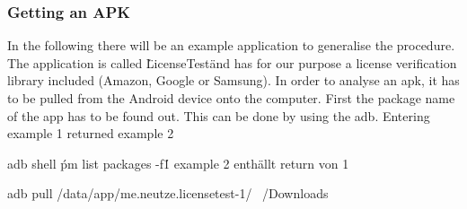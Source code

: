 \subsubsection{Getting an APK}\label{subsubsection:tools-apk}
In the following there will be an example application to generalise the procedure. The application is called \"LicenseTest\" and has for our purpose a license verification library included (Amazon, Google or Samsung).\newline
In order to analyse an \gls{apk}, it has to be pulled from the Android device onto the computer. First the package name of the app has to be found out. This can be done by using the \gls{adb}. Entering example 1 returned example 2

adb shell \'pm list packages -f\' 1
example 2 enthällt return von 1


adb pull /data/app/me.neutze.licensetest-1/ ~/Downloads
